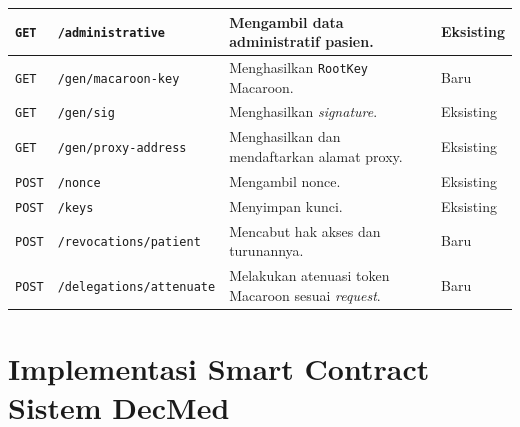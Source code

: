 \documentclass[bahasa, 12pt, a4paper, onecolumn, oneside, final]{report}
\begin{document}
{\begin{longtable}{|p{}|p{}|p{}|p{}|}
		\texttt{GET}    & \texttt{/administrative}
		                & Mengambil data administratif pasien.
		                & Eksisting                                                                                      \\ \hline

		\texttt{GET}    & \texttt{/gen/\allowbreak macaroon-\allowbreak key}
		                & Menghasilkan \texttt{RootKey} Macaroon.
		                & Baru                                                                                           \\ \hline

		\texttt{GET}    & \texttt{/gen/sig}
		                & Menghasilkan \textit{signature}.
		                & Eksisting                                                                                      \\ \hline

		\texttt{GET}    & \texttt{/gen/\allowbreak proxy-\allowbreak address}
		                & Menghasilkan dan mendaftarkan alamat proxy.
		                & Eksisting                                                                                      \\ \hline

		\texttt{POST}   & \texttt{/nonce}
		                & Mengambil nonce.
		                & Eksisting                                                                                      \\ \hline

		\texttt{POST}   & \texttt{/keys}
		                & Menyimpan kunci.
		                & Eksisting                                                                                      \\ \hline

		\texttt{POST}   & \texttt{/revocations/\allowbreak patient}
		                & Mencabut hak akses dan turunannya.
		                & Baru                                                                                           \\ \hline

		\texttt{POST}   & \texttt{/delegations/\allowbreak attenuate}
		                & Melakukan atenuasi token Macaroon sesuai \textit{request}.
		                & Baru                                                                                           \\ \hline
	\end{longtable}
} \chapter{Implementasi Smart Contract Sistem DecMed}
\label{lampiran:implementasi-smart-contract-sistem-decmed}
\end{document}
